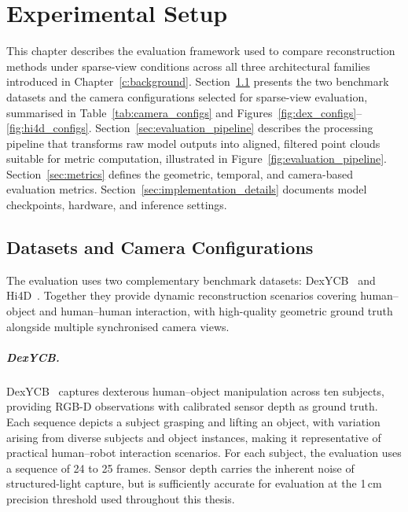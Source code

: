 \chapter{Experimental Setup}
\label{c:experimental_setup}

This chapter describes the evaluation framework used to compare reconstruction methods under sparse-view conditions across all three architectural families introduced in Chapter~\ref{c:background}. Section~\ref{sec:datasets} presents the two benchmark datasets and the camera configurations selected for sparse-view evaluation, summarised in Table~\ref{tab:camera_configs} and Figures~\ref{fig:dex_configs}--\ref{fig:hi4d_configs}. Section~\ref{sec:evaluation_pipeline} describes the processing pipeline that transforms raw model outputs into aligned, filtered point clouds suitable for metric computation, illustrated in Figure~\ref{fig:evaluation_pipeline}. Section~\ref{sec:metrics} defines the geometric, temporal, and camera-based evaluation metrics. Section~\ref{sec:implementation_details} documents model checkpoints, hardware, and inference settings.

\section{Datasets and Camera Configurations}
\label{sec:datasets}

The evaluation uses two complementary benchmark datasets: DexYCB~\cite{dexycb} and Hi4D~\cite{hi4d}. Together they provide dynamic reconstruction scenarios covering human--object and human--human interaction, with high-quality geometric ground truth alongside multiple synchronised camera views.

\paragraph{DexYCB.}
DexYCB~\cite{dexycb} captures dexterous human--object manipulation across ten
subjects, providing RGB-D observations with calibrated sensor depth as ground
truth. Each sequence depicts a subject grasping and lifting an object, with
variation arising from diverse subjects and object instances, making it
representative of practical human--robot interaction scenarios. For each subject,
the evaluation uses a sequence of 24 to 25 frames. Sensor depth carries the
inherent noise of structured-light capture, but is sufficiently accurate for
evaluation at the 1\,cm precision threshold used throughout this thesis.

